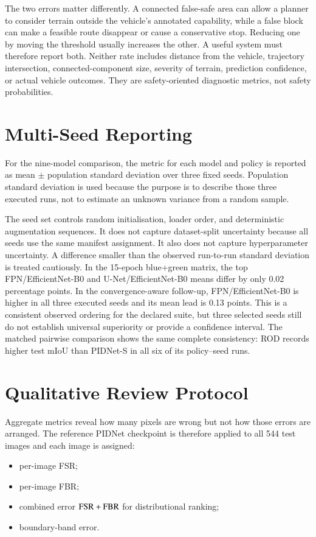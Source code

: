 The two errors matter differently. A connected false-safe area can allow a
planner to consider terrain outside the vehicle's annotated capability, while
a false block can make a feasible route disappear or cause a conservative
stop. Reducing one by moving the threshold usually increases the other. A
useful system must therefore report both. Neither rate includes distance from
the vehicle, trajectory intersection, connected-component size, severity of
terrain, prediction confidence, or actual vehicle outcomes. They are
safety-oriented diagnostic metrics, not safety probabilities.

\section{Multi-Seed Reporting}

For the nine-model comparison, the metric for each model and policy is reported as
mean $\pm$ population standard deviation over three fixed seeds. Population
standard deviation is used because the purpose is to describe those three
executed runs, not to estimate an unknown variance from a random sample.

The seed set controls random initialisation, loader order, and deterministic
augmentation sequences. It does not capture dataset-split uncertainty because
all seeds use the same manifest assignment. It also does not capture
hyperparameter uncertainty. A difference smaller than the observed run-to-run
standard deviation is treated cautiously. In the 15-epoch blue+green matrix,
the top FPN/EfficientNet-B0 and U-Net/EfficientNet-B0 means differ by only
0.02 percentage points. In the convergence-aware follow-up,
FPN/EfficientNet-B0 is higher in all three executed seeds and its mean lead is
0.13 points. This is a consistent observed ordering for the declared suite,
but three selected seeds still do not establish universal superiority or
provide a confidence interval. The matched pairwise comparison shows the same
complete consistency: ROD records higher test mIoU than PIDNet-S in all six of
its policy--seed runs.

\section{Qualitative Review Protocol}

Aggregate metrics reveal how many pixels are wrong but not how those errors
are arranged. The reference PIDNet checkpoint is therefore applied to all 544
test images and each image is assigned:
\begin{itemize}
  \item per-image FSR;
  \item per-image FBR;
  \item combined error $\mathrm{FSR}+\mathrm{FBR}$ for distributional ranking;
  \item boundary-band error.
\end{itemize}

